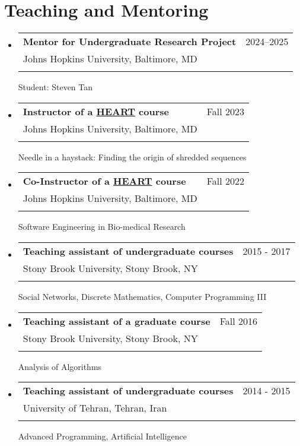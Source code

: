 \documentclass[A4,11pt]{article}
\makeatletter
\newcommand{\CVSubheading}[4]{
  \vspace{-2pt}\item
    \begin{tabular*}{0.97\textwidth}[t]{l@{\extracolsep{\fill}}r}
      \textbf{#1} & #2 \\
      \small#3 & \small #4 \\
    \end{tabular*}\vspace{-7pt}
}
\newcommand{\CVSubHeadingListStart}{\begin{itemize}[leftmargin=0.5cm, label={}]}
\newcommand{\CVSubHeadingListEnd}{\end{itemize}}
\makeatother
\begin{document}
\section{Teaching and Mentoring}
      \CVSubHeadingListStart
      \CVSubheading
      {Mentor for Undergraduate Research Project}{2024--2025}
      {Johns Hopkins University, Baltimore, MD}\\
      {Student: Steven Tan}{}
      \CVSubheading
      {Instructor of a \href{https://engineering.jhu.edu/education/undergraduate-studies/heart-heroic-courses/}{HEART} course}{Fall 2023}
      {Johns Hopkins University, Baltimore, MD}\\
      {Needle in a haystack: Finding the origin of shredded sequences}

      \CVSubheading
      {Co-Instructor of a \href{https://engineering.jhu.edu/education/undergraduate-studies/heart-heroic-courses/}{HEART} course}{Fall 2022}
      {Johns Hopkins University, Baltimore, MD}\\
      {Software Engineering in Bio-medical Research}

      \CVSubheading
          {Teaching assistant of undergraduate courses}{2015 - 2017}
          {Stony Brook University, Stony Brook, NY} \\
          {Social Networks, Discrete Mathematics, Computer Programming III}
        \CVSubheading
          {Teaching assistant of a graduate course}{Fall 2016}
          {Stony Brook University, Stony Brook, NY}\\
          {Analysis of Algorithms}
        \CVSubheading
          {Teaching assistant of undergraduate courses}{2014 - 2015}
          {University of Tehran, Tehran, Iran}\\
          {Advanced Programming, Artificial Intelligence}
        \CVSubHeadingListEnd
      
    
        \nocite{*}
        
    
\end{document}
